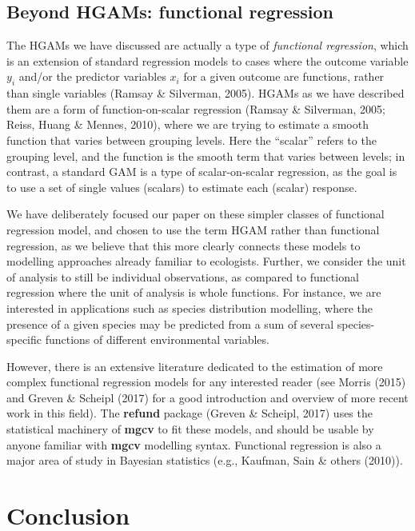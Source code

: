 \documentclass[12pt]{article}
\begin{document}
\subsection{Beyond HGAMs: functional
regression}\label{beyond-hgams-functional-regression}

The HGAMs we have discussed are actually a type of \emph{functional
regression}, which is an extension of standard regression models to
cases where the outcome variable \(y_i\) and/or the predictor variables
\(x_i\) for a given outcome are functions, rather than single variables
(Ramsay \& Silverman, 2005). HGAMs as we have described them are a form
of function-on-scalar regression (Ramsay \& Silverman, 2005; Reiss,
Huang \& Mennes, 2010), where we are trying to estimate a smooth
function that varies between grouping levels. Here the ``scalar'' refers
to the grouping level, and the function is the smooth term that varies
between levels; in contrast, a standard GAM is a type of
scalar-on-scalar regression, as the goal is to use a set of single
values (scalars) to estimate each (scalar) response.

We have deliberately focused our paper on these simpler classes of
functional regression model, and chosen to use the term HGAM rather than
functional regression, as we believe that this more clearly connects
these models to modelling approaches already familiar to ecologists.
Further, we consider the unit of analysis to still be individual
observations, as compared to functional regression where the unit of
analysis is whole functions. For instance, we are interested in
applications such as species distribution modelling, where the presence
of a given species may be predicted from a sum of several
species-specific functions of different environmental variables.

However, there is an extensive literature dedicated to the estimation of
more complex functional regression models for any interested reader (see
Morris (2015) and Greven \& Scheipl (2017) for a good introduction and
overview of more recent work in this field). The \textbf{refund} package
(Greven \& Scheipl, 2017) uses the statistical machinery of
\textbf{mgcv} to fit these models, and should be usable by anyone
familiar with \textbf{mgcv} modelling syntax. Functional regression is
also a major area of study in Bayesian statistics (e.g., Kaufman, Sain
\& others (2010)).

\section{Conclusion}\label{conclusion}
\end{document}
